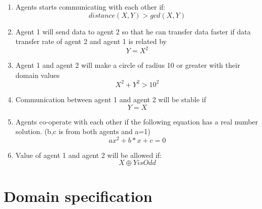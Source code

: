 \documentclass[conference]{IEEEtran}
\begin{document}
\begin{enumerate}
\item Agents starts communicating with each other if:
\begin{equation}
  distance(X,Y) > gcd(X,Y)
\end{equation}

\item Agent 1 will send data to agent 2 so that he can transfer data faster if data transfer rate of agent 2 and agent 1 is related by
\begin{equation}
    Y=X^2
\end{equation}

\item  Agent 1 and agent 2 will make a circle of radius 10 or greater with their domain values
\begin{equation}
    X^2 + Y^2 >10^2
\end{equation}

\item Communication between agent 1 and agent 2 will be stable if 
\begin{equation}
    Y=X
\end{equation}

\item Agents co-operate with each other if the following equation has a real number solution. (b,c is from both agents and a=1)
\begin{equation}
    ax^2 + b*x + c =0 
\end{equation}

\item Value of agent 1 and agent 2 will be allowed if:
\begin{equation}
    X \oplus  Y  is Odd
\end{equation}    
\end{enumerate}

\section{Domain specification}
\end{document}
